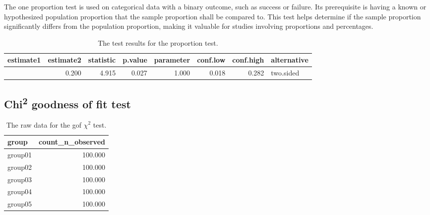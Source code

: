 \documentclass[
  a4paper,
]{scrbook}
\begin{document}
\endgroup

The one proportion test is used on categorical data with a binary
outcome, such as success or failure. Its prerequisite is having a known
or hypothesized population proportion that the sample proportion shall
be compared to. This test helps determine if the sample proportion
significantly differs from the population proportion, making it valuable
for studies involving proportions and percentages.

\begingroup
\fontsize{12.0pt}{14.4pt}\selectfont

\begin{longtable}{rrrrrrrl}

\caption{\label{tbl-prop-test-res}The test results for the proportion
test.}

\tabularnewline

\toprule
estimate1 & estimate2 & statistic & p.value & parameter & conf.low & conf.high & alternative \\ 
\midrule\addlinespace[2.5pt]
0.350 & 0.200 & 4.915 & 0.027 & 1.000 & 0.018 & 0.282 & two.sided \\ 
\bottomrule

\end{longtable}

\endgroup

\subsection{\texorpdfstring{Chi\textsuperscript{2} goodness of fit
test}{Chi2 goodness of fit test}}\label{chi2-goodness-of-fit-test}

\begingroup
\fontsize{12.0pt}{14.4pt}\selectfont

\begin{longtable}{lr}

\caption{\label{tbl-chi-gof-data}The raw data for the gof \(\chi^2\)
test.}

\tabularnewline

\toprule
group & count\_n\_observed \\ 
\midrule\addlinespace[2.5pt]
group01 & 100.000 \\ 
group02 & 100.000 \\ 
group03 & 100.000 \\ 
group04 & 100.000 \\ 
group05 & 100.000 \\ 
\bottomrule

\end{longtable}
\end{document}
